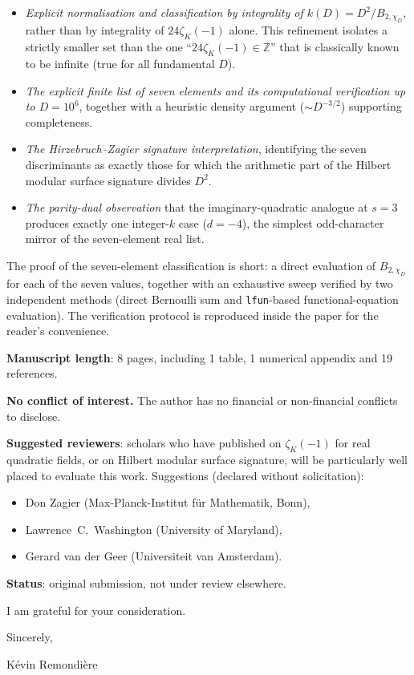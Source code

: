 \documentclass[11pt]{article}
\begin{document}
\begin{itemize}
\item \emph{Explicit normalisation and classification by integrality of
$k(D)=D^{2}/B_{2,\chi_{D}}$}, rather than by integrality of
$24\zeta_{K}(-1)$ alone.  This refinement isolates a strictly smaller
set than the one ``$24\zeta_{K}(-1)\in\mathbb{Z}$'' that is classically
known to be infinite (true for all fundamental $D$).
\item \emph{The explicit finite list of seven elements and its
computational verification up to $D=10^{6}$}, together with a
heuristic density argument ($\sim D^{-3/2}$) supporting completeness.
\item \emph{The Hirzebruch--Zagier signature interpretation}, identifying
the seven discriminants as exactly those for which the arithmetic
part of the Hilbert modular surface signature divides $D^{2}$.
\item \emph{The parity-dual observation} that the imaginary-quadratic
analogue at $s=3$ produces exactly one integer-$k$ case ($d=-4$),
the simplest odd-character mirror of the seven-element real list.
\end{itemize}

The proof of the seven-element classification is short: a direct
evaluation of $B_{2,\chi_{D}}$ for each of the seven values, together
with an exhaustive sweep verified by two independent methods
(direct Bernoulli sum and \texttt{lfun}-based functional-equation
evaluation).  The verification protocol is reproduced inside the
paper for the reader's convenience.

\textbf{Manuscript length}: 8 pages, including 1 table, 1 numerical
appendix and 19 references.

\textbf{No conflict of interest.}  The author has no financial or
non-financial conflicts to disclose.

\textbf{Suggested reviewers}: scholars who have published on
$\zeta_{K}(-1)$ for real quadratic fields, or on Hilbert modular surface
signature, will be particularly well placed to evaluate this work.
Suggestions (declared without solicitation):

\begin{itemize}
\item Don Zagier (Max-Planck-Institut f\"ur Mathematik, Bonn),
\item Lawrence~C.~Washington (University of Maryland),
\item Gerard van der Geer (Universiteit van Amsterdam).
\end{itemize}

\textbf{Status}: original submission, not under review elsewhere.

I am grateful for your consideration.

\bigskip\bigskip

\noindent Sincerely,

\bigskip
\noindent K\'evin Remondi\`ere
\end{document}
